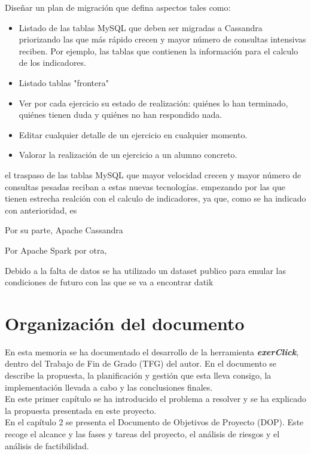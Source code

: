 Diseñar un plan de migración que defina aspectos tales como: 

\begin{itemize}
	\item Listado de las tablas MySQL que deben ser migradas a Cassandra priorizando las que más rápido crecen y mayor número de consultas intensivas reciben. Por ejemplo, las tablas que contienen la información para el calculo de los indicadores.
	\item Listado tablas "frontera"
	\item Ver por cada ejercicio su estado de realización: quiénes lo han terminado, quiénes tienen duda y quiénes no han respondido nada.
	\item Editar cualquier detalle de un ejercicio en cualquier momento.
	\item Valorar la realización de un ejercicio a un alumno concreto.
\end{itemize}

el traspaso de las tablas MySQL que mayor velocidad crecen  y mayor número de consultas pesadas reciban a estas nuevas tecnologías. empezando por las que tienen estrecha realción con el calculo de indicadores, ya que, como se ha indicado con anterioridad, es  

Por su parte, Apache Cassandra

Por Apache Spark por otra,

Debido a la falta de datos se ha utilizado un dataset publico para emular las condiciones de futuro con las que se va a encontrar datik

\section{Organización del documento}

En esta memoria se ha documentado  el desarrollo de la herramienta \textbf{\textit{exerClick}}, dentro del Trabajo de Fin de Grado (TFG) del autor. En el documento se describe la propuesta, la planificación y gestión que esta lleva consigo, la implementación llevada a cabo y las conclusiones finales.\\

En este primer capítulo se ha introducido el problema a resolver y se ha explicado la propuesta presentada en este proyecto.\\

En el capítulo 2 se presenta el Documento de Objetivos de Proyecto (DOP). Este recoge el alcance y las fases y tareas del proyecto, el análisis de riesgos y el análisis de factibilidad.\\

